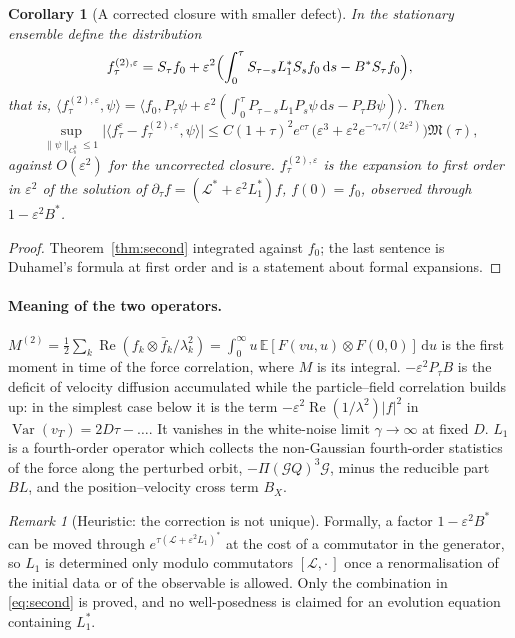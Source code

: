 \documentclass[11pt]{article}
\newcommand{\dd}{\mathrm{d}}
\newcommand{\E}{\mathbb{E}}
\newcommand{\eps}{\varepsilon}
\newcommand{\cL}{\mathcal{L}}
\newcommand{\cG}{\mathcal{G}}
\newcommand{\fM}{\mathfrak{M}}
\renewcommand{\Re}{\operatorname{Re}}
\newcommand{\nrm}[2]{\|#1\|_{#2}}
\newtheorem{corollary}[theorem]{Corollary}
\theoremstyle{remark}
\newtheorem{remark}[theorem]{Remark}
\begin{document}
\begin{corollary}[A corrected closure with smaller defect]\label{cor:corrected}
In the stationary ensemble define the distribution
\[
  f^{(2),\eps}_\tau=S_\tau f_0+\eps^2\Bigl(\int_0^\tau S_{\tau-s}L_1^*S_sf_0\,\dd s
  -B^*S_\tau f_0\Bigr),
\]
that is, $\langle f^{(2),\eps}_\tau,\psi\rangle=\langle f_0,P_\tau\psi
+\eps^2(\int_0^\tau P_{\tau-s}L_1P_s\psi\,\dd s-P_\tau B\psi)\rangle$. Then
\[
  \sup_{\nrm{\psi}{C_b^8}\le1}\bigl|\langle f^\eps_\tau-f^{(2),\eps}_\tau,
  \psi\rangle\bigr|\le C(1+\tau)^2e^{c\tau}\,
  \bigl(\eps^3+\eps^2e^{-\gamma_*\tau/(2\eps^2)}\bigr)\fM(\tau),
\]
against $O(\eps^2)$ for the uncorrected closure. $f^{(2),\eps}_\tau$ is the
expansion to first order in $\eps^2$ of the solution of
$\partial_\tau f=(\cL^*+\eps^2L_1^*)f$, $f(0)=f_0$, observed through
$1-\eps^2B^*$.
\end{corollary}

\begin{proof}
Theorem~\ref{thm:second} integrated against $f_0$; the last sentence is
Duhamel's formula at first order and is a statement about formal
expansions.
\end{proof}

\paragraph{Meaning of the two operators.}
$M^{(2)}=\frac12\sum_k\Re(f_k\otimes\bar f_k/\lambda_k^2)
=\int_0^\infty u\,\E[F(vu,u)\otimes F(0,0)]\,\dd u$ is the first moment in
time of the force correlation, where $M$ is its integral. $-\eps^2P_\tau B$
is the deficit of velocity diffusion accumulated while the particle--field
correlation builds up: in the simplest case below it is the term
$-\eps^2\Re(1/\lambda^2)|f|^2$ in $\operatorname{Var}(v_T)=2D\tau-\dots$. It
vanishes in the white-noise limit $\gamma\to\infty$ at fixed $D$. $L_1$ is
a fourth-order operator which collects the non-Gaussian fourth-order
statistics of the force along the perturbed orbit,
$-\Pi(\cG Q)^3\cG$, minus the reducible part $BL$, and the
position--velocity cross term $B_X$.

\begin{remark}[Heuristic: the correction is not unique]\label{rem:gauge}
Formally, a factor $1-\eps^2B^*$ can be moved through
$e^{\tau(\cL+\eps^2L_1)^*}$ at the cost of a commutator in the generator,
so $L_1$ is determined only modulo commutators $[\cL,\cdot\,]$ once a
renormalisation of the initial data or of the observable is allowed. Only
the combination in \eqref{eq:second} is proved, and no well-posedness is
claimed for an evolution equation containing $L_1^*$.
\end{remark}
\end{document}

